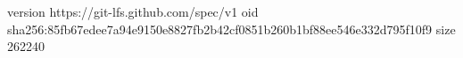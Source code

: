 version https://git-lfs.github.com/spec/v1
oid sha256:85fb67edee7a94e9150e8827fb2b42cf0851b260b1bf88ee546e332d795f10f9
size 262240
